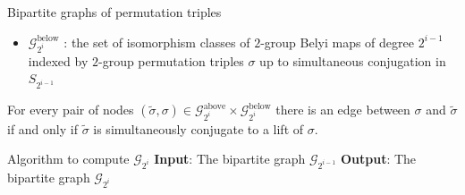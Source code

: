 \documentclass[xcolor=dvipsnames]{beamer}
\theoremstyle{plain}
\newcommand{\wt}[1]{\widetilde{#1}}
\DeclareMathOperator{\Lifts}{Lifts}
\begin{document}
{\begin{frame}{Bipartite graphs of permutation triples}
\begin{itemize}
          $\mathscr{G}_{2^i}^\text{above}$ :
          the set of isomorphism classes of $2$-group Belyi maps
          of degree $2^i$
          indexed by $2$-group permutation triples
          $\wt{\sigma}$ up to simultaneous conjugation
          in $S_{2^i}$
        \item
          $\mathscr{G}_{2^i}^\text{below}$ :
          the set of isomorphism classes of $2$-group Belyi maps
          of degree $2^{i-1}$
          indexed by $2$-group permutation triples
          $\sigma$ up to simultaneous conjugation
          in $S_{2^{i-1}}$
      \end{itemize}
      \pause
      For every pair of nodes
      $(\wt{\sigma},\sigma)\in
      \mathscr{G}_{2^i}^\text{above}\times
      \mathscr{G}_{2^i}^\text{below}$
      there is an edge between
      $\sigma$ and $\wt{\sigma}$
      if and only if $\wt{\sigma}$ is
      simultaneously conjugate to a lift of
      $\sigma$.
    \end{frame}
    \begin{frame}{Algorithm to compute $\mathscr{G}_{2^i}$}
      \textbf{Input}:
      The bipartite graph $\mathscr{G}_{2^{i-1}}$
      \newline
      \textbf{Output}:
      The bipartite graph $\mathscr{G}_{2^{i}}$
      \pause\par
\end{frame}}
\end{document}

